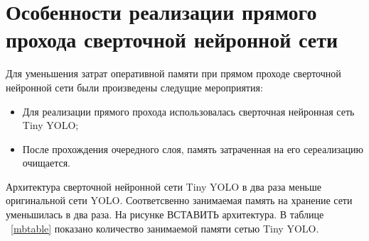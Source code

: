 \documentclass[a4paper,english,russian]{G2-105}
\begin{document}
\section{Особенности реализации прямого прохода сверточной нейронной сети}
\par Для уменьшения затрат оперативной памяти при прямом проходе сверточной нейронной сети были произведены следущие мероприятия:
\begin{itemize}
\item Для реализации прямого прохода использовалась сверточная нейронная сеть Tiny YOLO;
\item После прохождения очередного слоя, память затраченная на его сереализацию очищается.
\end{itemize}
\par Архитектура сверточной нейронной сети Tiny YOLO в два раза меньше оригинальной сети YOLO. Соответсвенно занимаемая память на хранение сети уменьшилась в два раза. На рисунке ВСТАВИТЬ архитектура. В таблице ~\ref{mbtable} показано количество занимаемой памяти сетью Tiny YOLO.
\end{document}
